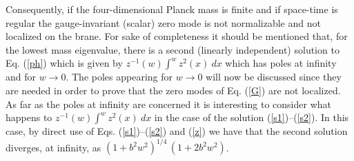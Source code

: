\documentclass[a4paper,12pt]{article}
\begin{document}
Consequently, if the four-dimensional Planck mass is finite and if 
space-time is  regular the gauge-invariant (scalar) 
 zero mode is not normalizable and not localized on the brane.
For sake of completeness it should be mentioned that, for the lowest 
mass eigenvalue, 
there is a second (linearly independent) solution to Eq. (\ref{ph}) 
which is given by $ z^{-1}(w) \int^{w} z^2(x) ~dx$ which has poles at 
infinity and for $w\rightarrow 0$.
The poles appearing for $w\rightarrow 0$
will now be discussed since they are needed in order to prove that 
the zero modes of Eq. (\ref{G}) are not localized. As far as the poles 
 at infinity are concerned it is interesting to consider 
what happens to  
$ z^{-1}(w) \int^{w} z^2(x) ~dx$ in the case of the solution 
(\ref{s1})--(\ref{s2}). In this case, by direct use of Eqs. 
(\ref{s1})--(\ref{s2}) and (\ref{z}) we have that the second solution
diverges, at infinity, as $ (1 + b^2 w^2)^{1/4}\, (1 + 2 b^2 w^2)$. 
\end{document}
